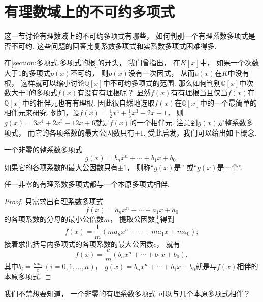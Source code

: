\section{有理数域上的不可约多项式}
这一节讨论有理数域上的不可约多项式有哪些，
如何判别一个有理系数多项式是否不可约.
这些问题的回答比复系数多项式和实系数多项式困难得多.

在\cref{section:多项式.多项式的根}的开头，
我们曾指出，
在\(K[x]\)中，
如果一个次数大于1的多项式\(p(x)\)不可约，
则\(p(x)\)没有一次因式，
从而\(p(x)\)在\(K\)中没有根，
这样就可以缩小讨论\(\mathbb{Q}[x]\)中不可约多项式的范围.
那么如何判别\(\mathbb{Q}[x]\)中次数大于1的多项式\(f(x)\)有没有有理根呢？
显然\(f(x)\)有有理根当且仅当\(f(x)\)在\(\mathbb{Q}[x]\)中的相伴元也有有理根.
因此很自然地选取\(f(x)\)在\(\mathbb{Q}[x]\)中的一个最简单的相伴元来研究.
例如，设\(f(x)=\frac12x^4+\frac13x^3-2x+1\)，
则\(g(x)=3x^4+2x^3-12x+6\)就是\(f(x)\)的一个相伴元.
注意到\(g(x)\)是整系数多项式，
而它的各项系数的最大公因数只有\(\pm1\).
受此启发，我们可以给出如下概念.

\begin{definition}
一个非零的整系数多项式\begin{equation*}
	g(x)=b_n x^n+\dotsb+b_1 x+b_0,
\end{equation*}
如果它的各项系数的最大公因数只有\(\pm1\)，
则称“\(g(x)\)是”
或“\(g(x)\)是一个”.
\end{definition}

\begin{proposition}
任一非零的有理系数多项式都与一个本原多项式相伴.
\begin{proof}
只需求出有理系数多项式\begin{equation*}
	f(x)=a_n x^n+\dotsb+a_1 x+a_0
\end{equation*}的各项系数的分母的最小公倍数\(m\)，
提取公因数\(\frac1m\)得到\begin{equation*}
	f(x)=\frac1m(m a_n x^n+\dotsb+m a_1 x+m a_0);
\end{equation*}
接着求出括号内多项式的各项系数的最大公因数\(c\)，
就有\begin{equation*}
	f(x)=\frac{c}{m}(b_n x^n+\dotsb+b_1 x+b_0),
\end{equation*}
其中\(b_i=\frac{m a_i}{c}\ (i=0,1,\dotsc,n)\)，
\(g(x)=b_n x^n+\dotsb+b_1 x+b_0\)就是与\(f(x)\)相伴的本原多项式.
\end{proof}
\end{proposition}

我们不禁想要知道，
一个非零的有理系数多项式
可以与几个本原多项式相伴？

